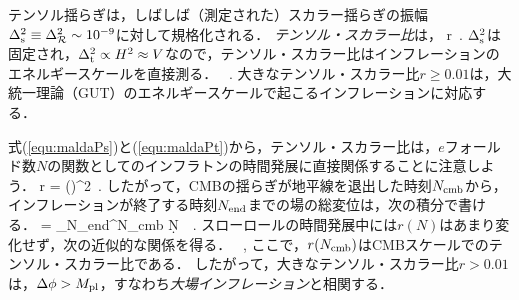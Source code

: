 




テンソル揺らぎは，しばしば（測定された）スカラー揺らぎの振幅$\Delta_{\rm s}^2 \equiv \Delta_{\cal R}^2 \sim 10^{-9}$に対して規格化される．
{\it テンソル・スカラー比}は，
\beq
r\equiv {}\, .
\eeq
$\Delta_{\rm s}^2$は固定され，$\Delta_{\rm t}^2 \propto H^2 \approx V$なので，テンソル・スカラー比はインフレーションのエネルギースケールを直接測る．
\beq
{}\, .
\eeq 
大きなテンソル・スカラー比$r \ge 0.01$は，大統一理論（GUT）のエネルギースケールで起こるインフレーションに対応する．


式(\ref{equ:maldaPs})と(\ref{equ:maldaPt})から，テンソル・スカラー比は，$e$フォールド数$N$の関数としてのインフラトンの時間発展に直接関係することに注意しよう．
\beq
r =  \left(\right)^2\, .
\eeq
したがって，CMBの揺らぎが地平線を退出した時刻$N_{\rm cmb}$から，インフレーションが終了する時刻$N_{\rm end}$までの場の総変位は，次の積分で書ける．
\beq
\frac{\Delta \phi}{\Mp} = \int_{N_{\rm end}}^{N_{\rm cmb}} \d N\,  \, .
\eeq
スローロールの時間発展中には$r(N)$はあまり変化せず，次の近似的な関係を得る\cite{Lyth}．
\beq
{}\, ,
\eeq
ここで，$r(N_{\rm cmb})$はCMBスケールでのテンソル・スカラー比である．
したがって，大きなテンソル・スカラー比$r > 0.01$は，$\Delta \phi > M_{\rm pl}$，すなわち{\it 大場インフレーション}と相関する．

